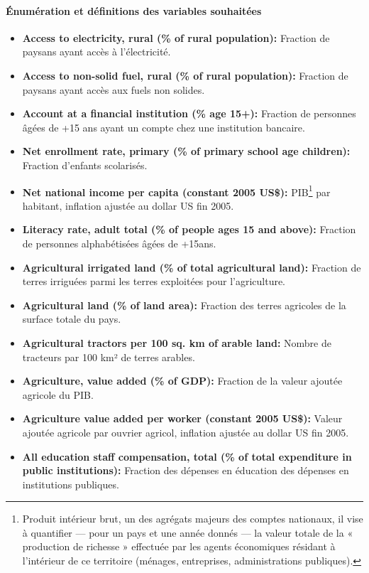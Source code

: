 	\paragraph{Énumération et définitions des variables souhaitées }
	\begin{itemize}
		\item \textbf{ Access to electricity, rural (\% of rural population):} Fraction de paysans ayant accès à l'électricité.
		\item \textbf{ Access to non-solid fuel, rural (\% of rural population):} Fraction de paysans ayant accès aux fuels non solides.
		\item \textbf{ Account at a financial institution (\% age 15+):} Fraction de personnes âgées de +15 ans ayant un compte chez une institution bancaire.
		\item \textbf{ Net enrollment rate, primary (\% of primary school age children):} Fraction d'enfants scolarisés.
		\item \textbf{ Net national income per capita (constant 2005 US\$):} PIB\footnote{Produit intérieur brut, un des agrégats majeurs des comptes nationaux, il vise à quantifier — pour un pays et une année donnés — la valeur totale de la « production de richesse » effectuée par les agents économiques résidant à l’intérieur de ce territoire (ménages, entreprises, administrations publiques).} par habitant, inflation ajustée au dollar US fin 2005.
		\item \textbf{ Literacy rate, adult total (\% of people ages 15 and above):} Fraction de personnes alphabétisées âgées de +15ans.
		\item \textbf{ Agricultural irrigated land (\% of total agricultural land):} Fraction de terres irriguées parmi les terres exploitées pour l'agriculture.
		\item \textbf{ Agricultural land (\% of land area):} Fraction des terres agricoles de la surface totale du pays.
		\item \textbf{ Agricultural tractors per 100 sq. km of arable land:} Nombre de tracteurs par 100 km² de terres arables.
		\item \textbf{ Agriculture, value added (\% of GDP):} Fraction de la valeur ajoutée agricole du PIB.
		\item \textbf{ Agriculture value added per worker (constant 2005 US\$):} Valeur ajoutée agricole par ouvrier agricol, inflation ajustée au dollar US fin 2005.
		\item \textbf{ All education staff compensation, total (\% of total expenditure in public institutions):} Fraction des dépenses en éducation des dépenses en institutions publiques.

\end{itemize}
